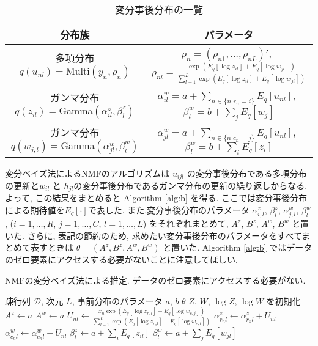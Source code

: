 \documentclass[a4paper,12pt]{jsarticle} %
\numberwithin{equation}{section} %
\begin{document}
\renewcommand{\arraystretch}{1.6}
\begin{table}
\centering
\caption{変分事後分布の一覧} \label{post1}
\begin{tabular}{cc}
\hline
分布族 & パラメータ\\
\hline
多項分布 $q(u_{nl}) = \mathrm{Multi}(y_n, \rho_n)$ & $\rho_n = (\rho_{n1},\dots, \rho_{nL})'$,~ $\displaystyle \rho_{nl} = \frac{\exp(E_q[\log z_{il}] + E_q[\log w_{jl}] )}{ \sum_{l=1}^L \exp(E_q[\log z_{il}] + E_q[\log w_{jl}] )}$\\
ガンマ分布 $q(z_{il}) = \mathrm{Gamma}(\alpha^z_{il}, \beta^z_l)$ & $\displaystyle \alpha^w_{il}=a+\sum_{n \in \{n|r_n=i\}} E_q[u_{nl}]$,~ $\displaystyle \beta^w_{l} = b+\sum_j E_q[w_j]$\\
ガンマ分布 $q(w_{j,l}) = \mathrm{Gamma}(\alpha^w_{jl}, \beta^w_{l})$ & $\displaystyle \alpha^w_{jl}=a+\sum_{n \in \{n|c_n=j\}} E_q[u_{nl}]$,~ $\displaystyle \beta^w_{l} = b+\sum_i E_q[z_i]$ \\
\hline
\end{tabular}
\end{table}
\renewcommand{\arraystretch}{1}

変分ベイズ法によるNMFのアルゴリズムは $u_{ijl}$ の変分事後分布である多項分布の更新と$w_{il}$ と $h_{jl}$の変分事後分布であるガンマ分布の更新の繰り返しからなる. 
よって, この結果をまとめると Algorithm \ref{alg:b} を得る. ここでは変分事後分布による期待値を$E_q[\cdot]$で表した. また,変分事後分布のパラメータ $\alpha^z_{i,l}$, $\beta^z_{l}$, $\alpha^w_{j,l}$, $\beta^w_{l}$, ($i=1,\ldots, R$, $j=1,\ldots, C$, $l=1, \ldots ,L$) をそれぞれまとめて, $A^z$, $B^z$, $A^w$, $B^w$ と置いた. さらに, 表記の節約のため, 求めたい変分事後分布のパラメータをすべてまとめて表すときは $\theta = (A^z, B^z, A^w, B^w)$ と置いた. Algorithm \ref{alg:b} ではデータのゼロ要素にアクセスする必要がないことに注意してほしい.

\begin{algorithm}[tbp]
\caption{NMFの変分ベイズ法による推定. データのゼロ要素にアクセスする必要がない. }\label{alg:b}
\begin{algorithmic}
\Require \Require 疎行列 $\mathcal{D}$, 次元 $L$, 事前分布のパラメータ $a$, $b$
\Ensure $\theta$ 
\State $Z$, $W$, $\log Z$, $\log W$ を初期化  
\State $A^z \leftarrow  a$  
\State $A^w \leftarrow a$
 
    \State $\displaystyle U_{nl} \leftarrow  \frac{x_n \exp(E_q[\log z_{r_nl}] + E_q[ \log w_{c_n j}] )}{ \sum_{l=1}^L \exp(E_q[\log z_{r_nl}]+E_q[\log w_{c_n l}] )}$  
    \State $\alpha^z_{r_n l}  \leftarrow \alpha^z_{r_nl} + U_{nl}$ 
    \State $\alpha^w_{c_n l} \leftarrow  \alpha^w_{c_n l}+ U_{nl}$
\EndFor
    \EndFor
    \State $\beta^z_{l}  \leftarrow  a +  \sum_i E_q[z_{il}]$
    \State $\beta^w_{l}  \leftarrow a + \sum_j E_q[w_{jl}]$
        \EndFor
\EndWhile
\end{algorithmic}
\end{algorithm}
\end{document}
